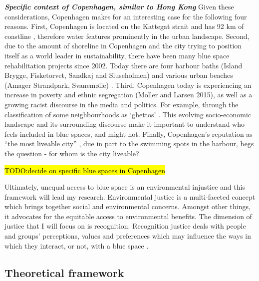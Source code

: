 \documentclass{article}
\newcommand{\bisection}[1]{\textbf{\textit{#1}}}
\begin{document}
\bisection{Specific context of Copenhagen, similar to Hong Kong}
Given these considerations, Copenhagen makes for an interesting case for the following four reasons. First, Copenhagen is located on the Kattegat strait and has 92 km of coastline \parencite{comertler2017greens}, therefore water features prominently in the urban landscape. Second, due to the amount of shoreline in Copenhagen and the city trying to position itself as a world leader in sustainability, there have been many blue space rehabilitation projects since 2002. Today there are four harbour baths (Island Brygge, Fisketorvet, Sandkaj and Sluseholmen) and various urban beaches (Amager Strandpark, Svanemølle) \parencite{visitcopenhagen_baths}. Third, Copenhagen today is experiencing an increase in poverty and ethnic segregation (Moller and Larsen 2015), as well as a growing racist discourse in the media and politics. For example, through the classification of some neighbourhoods as ‘ghettos’  \parencite{simonsen2008practice}. This evolving socio-economic landscape and its surrounding discourse make it important to understand who feels included in blue spaces, and might not. Finally, Copenhagen’s reputation as “the most liveable city” \parencite{visitdenmark_2021}, due in part to the swimming spots in the harbour, begs the question - for whom is the city liveable?

\hl{TODO:decide on specific blue spaces in Copenhagen}

Ultimately, unequal access to blue space is an environmental injustice and this framework will lead my research. Environmental justice is a multi-faceted concept which brings together social and environmental concerns. Amongst other things, it advocates for the equitable access to environmental benefits. The dimension of justice that I will focus on is recognition. Recognition justice deals with people and groups’ perceptions, values and preferences which may influence the ways in which they interact, or not, with a blue space \parencite{anguelovski2020expanding}.

\subsection{Theoretical framework}
\end{document}
